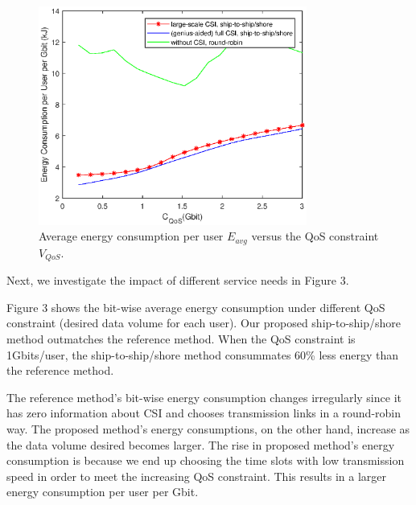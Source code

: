 \documentclass[conference]{IEEEtran}
\begin{document}
 
 \begin{figure} [htb]
 \begin{center}
 \includegraphics*[width=8.8cm]{Cqos.eps}
 \end{center}
 \vspace*{-4mm} 
 \caption{Average energy consumption per user $E_{avg}$ versus the QoS constraint ${V_{QoS}}$.}\label{fig:3}
 \vspace*{-2mm} 
 \end{figure}
 
 
 
 Next, we investigate the impact of different service needs in Figure 3. 
 
 Figure 3 shows the bit-wise average energy consumption under different QoS constraint (desired data volume for each user).
 Our proposed ship-to-ship/shore method outmatches the reference method. When the QoS constraint is 1Gbits/user, the ship-to-ship/shore method consummates 60\% less energy than the reference method. 
 
 The reference method's bit-wise energy consumption changes irregularly since it has zero information about CSI and chooses transmission links in a round-robin way. The proposed method's energy consumptions, on the other hand, increase as the data volume desired becomes larger. The rise in proposed method's energy consumption is because we end up choosing the time slots with low transmission speed in order to meet the increasing QoS constraint. This results in a larger energy consumption per user per Gbit. 
 
 
 
\end{document}
